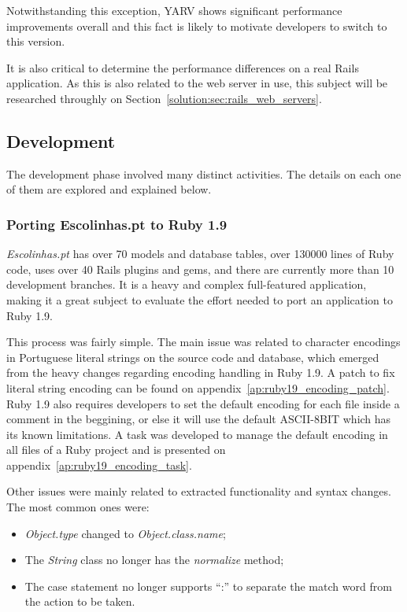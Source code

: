 Notwithstanding this exception, YARV shows significant performance improvements overall and this fact is likely to motivate developers to switch to this version.

It is also critical to determine the performance differences on a real Rails application. As this is also related to the web server in use, this subject will be researched throughly on Section~\ref{solution:sec:rails_web_servers}.

\subsection{Development}
The development phase involved many distinct activities. The details on each one of them are explored and explained below.

\subsubsection{Porting Escolinhas.pt to Ruby 1.9}
\textit{Escolinhas.pt} has over 70 models and database tables, over 130000 lines of Ruby code, uses over 40 Rails plugins and gems, and there are currently more than 10 development branches. It is a heavy and complex full-featured application, making it a great subject to evaluate the effort needed to port an application to Ruby 1.9.

This process was fairly simple. The main issue was related to character encodings in Portuguese literal strings on the source code and database, which emerged from the heavy changes regarding encoding handling in Ruby 1.9. A patch to fix literal string encoding can be found on appendix~\ref{ap:ruby19_encoding_patch}. Ruby 1.9 also requires developers to set the default encoding for each file inside a comment in the beggining, or else it will use the default ASCII-8BIT which has its known limitations. A task was developed to manage the default encoding in all files of a Ruby project and is presented on appendix~\ref{ap:ruby19_encoding_task}.

Other issues were mainly related to extracted functionality and syntax changes. The most common ones were:
\begin{itemize}
  \item \textit{Object.type} changed to \textit{Object.class.name};
  \item The \textit{String} class no longer has the \textit{normalize} method;
  \item The case statement no longer supports ``:'' to separate the match word from the action to be taken.
\end{itemize}

